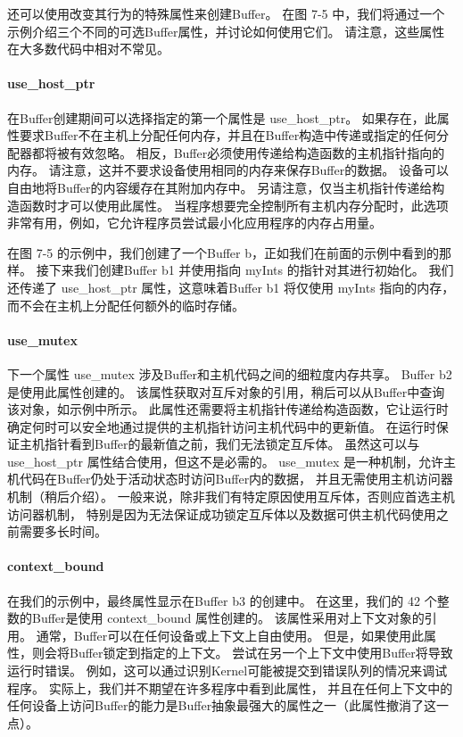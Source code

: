 还可以使用改变其行为的特殊属性来创建Buffer。 
在图 7-5 中，我们将通过一个示例介绍三个不同的可选Buffer属性，并讨论如何使用它们。 
请注意，这些属性在大多数代码中相对不常见。

\paragraph{use\_host\_ptr}

在Buffer创建期间可以选择指定的第一个属性是 use\_host\_ptr。 
如果存在，此属性要求Buffer不在主机上分配任何内存，并且在Buffer构造中传递或指定的任何分配器都将被有效忽略。 
相反，Buffer必须使用传递给构造函数的主机指针指向的内存。 请注意，这并不要求设备使用相同的内存来保存Buffer的数据。 
设备可以自由地将Buffer的内容缓存在其附加内存中。 另请注意，仅当主机指针传递给构造函数时才可以使用此属性。 
当程序想要完全控制所有主机内存分配时，此选项非常有用，例如，它允许程序员尝试最小化应用程序的内存占用量。

在图 7-5 的示例中，我们创建了一个Buffer b，正如我们在前面的示例中看到的那样。 
接下来我们创建Buffer b1 并使用指向 myInts 的指针对其进行初始化。 
我们还传递了 use\_host\_ptr 属性，这意味着Buffer b1 将仅使用 myInts 指向的内存，
而不会在主机上分配任何额外的临时存储。

\paragraph{use\_mutex}

下一个属性 use\_mutex 涉及Buffer和主机代码之间的细粒度内存共享。 Buffer b2 是使用此属性创建的。 
该属性获取对互斥对象的引用，稍后可以从Buffer中查询该对象，如示例中所示。 
此属性还需要将主机指针传递给构造函数，它让运行时确定何时可以安全地通过提供的主机指针访问主机代码中的更新值。 
在运行时保证主机指针看到Buffer的最新值之前，我们无法锁定互斥体。 
虽然这可以与 use\_host\_ptr 属性结合使用，但这不是必需的。 
use\_mutex 是一种机制，允许主机代码在Buffer仍处于活动状态时访问Buffer内的数据，
并且无需使用主机访问器机制（稍后介绍）。 
一般来说，除非我们有特定原因使用互斥体，否则应首选主机访问器机制，
特别是因为无法保证成功锁定互斥体以及数据可供主机代码使用之前需要多长时间。

\paragraph{context\_bound}

在我们的示例中，最终属性显示在Buffer b3 的创建中。 
在这里，我们的 42 个整数的Buffer是使用 context\_bound 属性创建的。 
该属性采用对上下文对象的引用。 通常，Buffer可以在任何设备或上下文上自由使用。 
但是，如果使用此属性，则会将Buffer锁定到指定的上下文。 尝试在另一个上下文中使用Buffer将导致运行时错误。 
例如，这可以通过识别Kernel可能被提交到错误队列的情况来调试程序。 
实际上，我们并不期望在许多程序中看到此属性，
并且在任何上下文中的任何设备上访问Buffer的能力是Buffer抽象最强大的属性之一（此属性撤消了这一点）。

